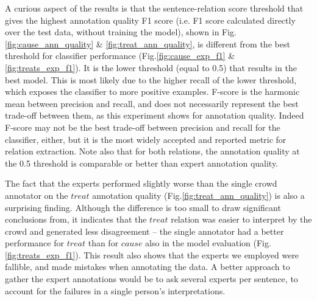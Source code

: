A curious aspect of the results is that the sentence-relation score threshold that gives the highest annotation quality F1 score (i.e. F1 score calculated directly over the test data, without training the model), shown in Fig.\ref{fig:cause_ann_quality} \& \ref{fig:treat_ann_quality}, is different from the best threshold for classifier performance (Fig.\ref{fig:cause_exp_f1} \& \ref{fig:treats_exp_f1}). It is the lower threshold (equal to 0.5) that results in the best model. This is most likely due to the higher recall of the lower threshold, which exposes the classifier to more positive examples.  F-score is the harmonic mean between precision and recall, and does not necessarily represent the best trade-off between them, as this experiment shows for annotation quality.  Indeed F-score may not be the best trade-off between precision and recall for the classifier, either, but it is the most widely accepted and reported metric for relation extraction.  Note also that for both relations, the annotation quality at the 0.5 threshold is comparable or better than expert annotation quality.

The fact that the experts performed slightly worse than the single crowd annotator on the $treat$ annotation quality (Fig.\ref{fig:treat_ann_quality}) is also a surprising finding. Although the difference is too small to draw significant conclusions from, it indicates that the $treat$ relation was easier to interpret by the crowd and generated less disagreement -- the single annotator had a better performance for $treat$ than for $cause$ also in the model evaluation (Fig.\ref{fig:treats_exp_f1}). This result also shows that the experts we employed were fallible, and made mistakes when annotating the data. A better approach to gather the expert annotations would be to ask several experts per sentence, to account for the failures in a single person's interpretations.

